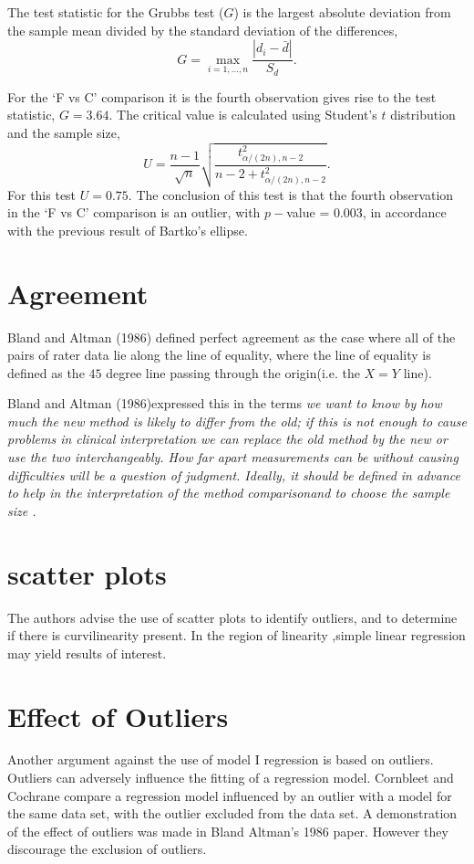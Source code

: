 \documentclass[12pt, a4paper]{report}
\theoremstyle{plain}
\theoremstyle{definition}
\theoremstyle{remark}
\begin{document}
	The test statistic for the Grubbs test ($G$) is the largest
	absolute deviation from the sample mean divided by the standard
	deviation of the differences,
	\begin{equation}
	G =  \displaystyle\max_{i=1,\ldots, n}\frac{\left \vert d_i -
		\bar{d}\right\vert}{S_{d}}.
	\end{equation}
	
	For the `F vs C' comparison it is the fourth observation gives
	rise to the test statistic, $G = 3.64$. The critical value is
	calculated using Student's $t$ distribution and the sample size,
	\[
	U = \frac{n-1}{\sqrt{n}} \sqrt{\frac{t_{\alpha/(2n),n-2}^2}{n - 2
			+ t_{\alpha/(2n),n-2}^2}}.
	\]
	For this test $U = 0.75$. The conclusion of this test is that the fourth observation in the `F vs C' comparison is an outlier, with $p-$value = 0.003, in accordance with the previous result of Bartko's ellipse.
	

	\section{Agreement} Bland and Altman (1986) defined perfect
	agreement as the case where all of the pairs of rater data lie
	along the line of equality, where the line of equality is defined
	as the $45$ degree line passing through the origin(i.e. the $X=Y$
	line).
	
	Bland and Altman (1986)expressed this in the terms \emph{we want
		to know by how much the new method is likely to differ from the
		old; if this is not enough to cause problems in clinical
		interpretation we can replace the old method by the new or use the
		two interchangeably. How far apart measurements can be without
		causing difficulties will be a question of judgment. Ideally, it
		should be defined in advance to help in the interpretation of the
		method comparisonand to choose the sample size .}

	\section{scatter plots} The authors advise the
	use of scatter plots to identify outliers, and to determine if
	there is curvilinearity present. In the region of linearity
	,simple linear regression may yield results of interest.
	
	\section{Effect of Outliers} Another argument against
	the use of model I regression is based on outliers. Outliers can
	adversely influence the fitting of a regression model. Cornbleet
	and Cochrane compare a regression model influenced by an outlier
	with a model for the same data set, with the outlier excluded from
	the data set. A demonstration of the effect of outliers was made
	in Bland Altman's 1986 paper. However they discourage the
	exclusion of outliers.
	
\end{document}
